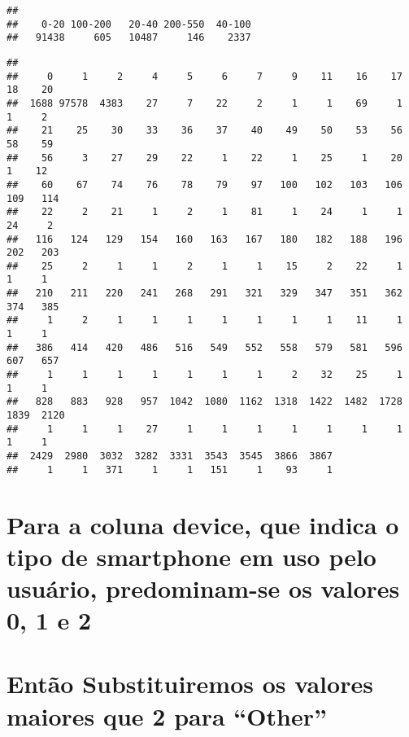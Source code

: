 \documentclass[
]{article}
\newenvironment{Shaded}{\begin{snugshade}}{\end{snugshade}}
\newcommand{\FunctionTok}[1]{\textcolor[rgb]{0.00,0.00,0.00}{#1}}
\newcommand{\NormalTok}[1]{#1}
\newcommand{\SpecialCharTok}[1]{\textcolor[rgb]{0.00,0.00,0.00}{#1}}
\begin{document}
\begin{verbatim}
## 
##    0-20 100-200   20-40 200-550  40-100 
##   91438     605   10487     146    2337
\end{verbatim}

\begin{Shaded}
\end{Shaded}

\begin{verbatim}
## 
##     0     1     2     4     5     6     7     9    11    16    17    18    20 
##  1688 97578  4383    27     7    22     2     1     1    69     1     1     2 
##    21    25    30    33    36    37    40    49    50    53    56    58    59 
##    56     3    27    29    22     1    22     1    25     1    20     1    12 
##    60    67    74    76    78    79    97   100   102   103   106   109   114 
##    22     2    21     1     2     1    81     1    24     1     1    24     2 
##   116   124   129   154   160   163   167   180   182   188   196   202   203 
##    25     2     1     1     2     1     1    15     2    22     1     1     1 
##   210   211   220   241   268   291   321   329   347   351   362   374   385 
##     1     2     1     1     1     1     1     1     1    11     1     1     1 
##   386   414   420   486   516   549   552   558   579   581   596   607   657 
##     1     1     1     1     1     1     1     2    32    25     1     1     1 
##   828   883   928   957  1042  1080  1162  1318  1422  1482  1728  1839  2120 
##     1     1     1    27     1     1     1     1     1     1     1     1     1 
##  2429  2980  3032  3282  3331  3543  3545  3866  3867 
##     1     1   371     1     1   151     1    93     1
\end{verbatim}

\hypertarget{para-a-coluna-device-que-indica-o-tipo-de-smartphone-em-uso-pelo-usuuxe1rio-predominam-se-os-valores-0-1-e-2}{%
\section{Para a coluna device, que indica o tipo de smartphone em uso
pelo usuário, predominam-se os valores 0, 1 e
2}\label{para-a-coluna-device-que-indica-o-tipo-de-smartphone-em-uso-pelo-usuuxe1rio-predominam-se-os-valores-0-1-e-2}}

\hypertarget{entuxe3o-substituiremos-os-valores-maiores-que-2-para-other}{%
\section{Então Substituiremos os valores maiores que 2 para
``Other''}\label{entuxe3o-substituiremos-os-valores-maiores-que-2-para-other}}
\end{document}
